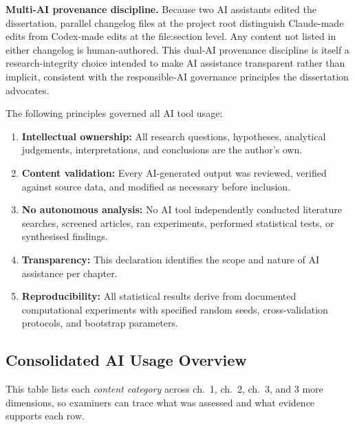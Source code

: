 \vspace{0.3em}
\noindent\textbf{Multi-AI provenance discipline.} Because two AI assistants edited the dissertation, parallel changelog files at the project root distinguish Claude-made edits from Codex-made edits at the file:section level. Any content not listed in either changelog is human-authored. This dual-AI provenance discipline is itself a research-integrity choice intended to make AI assistance transparent rather than implicit, consistent with the responsible-AI governance principles the dissertation advocates.

\vspace{0.5em}
\noindent The following principles governed all AI tool usage:

\begin{enumerate}
\item \textbf{Intellectual ownership:} All research questions, hypotheses, analytical judgements, interpretations, and conclusions are the author's own.

\item \textbf{Content validation:} Every AI-generated output was reviewed, verified against source data, and modified as necessary before inclusion.

\item \textbf{No autonomous analysis:} No AI tool independently conducted literature searches, screened articles, ran experiments, performed statistical tests, or synthesised findings.

\item \textbf{Transparency:} This declaration identifies the scope and nature of AI assistance per chapter.

\item \textbf{Reproducibility:} All statistical results derive from documented computational experiments with specified random seeds, cross-validation protocols, and bootstrap parameters.
\end{enumerate}


\subsection{Consolidated AI Usage Overview}
\label{sec:ai_overview}


\noindent This table lists each \textit{content category} across ch.~1, ch.~2, ch.~3, and 3 more dimensions, so examiners can trace what was assessed and what evidence supports each row.



